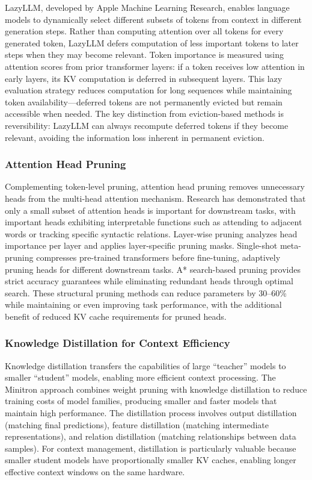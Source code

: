 \documentclass[11pt,letterpaper]{article}
\begin{document}
LazyLLM, developed by Apple Machine Learning Research, enables language models to dynamically select different subsets of tokens from context in different generation steps. Rather than computing attention over all tokens for every generated token, LazyLLM defers computation of less important tokens to later steps when they may become relevant. Token importance is measured using attention scores from prior transformer layers: if a token receives low attention in early layers, its KV computation is deferred in subsequent layers. This lazy evaluation strategy reduces computation for long sequences while maintaining token availability---deferred tokens are not permanently evicted but remain accessible when needed. The key distinction from eviction-based methods is reversibility: LazyLLM can always recompute deferred tokens if they become relevant, avoiding the information loss inherent in permanent eviction.

\subsubsection{Attention Head Pruning}

Complementing token-level pruning, attention head pruning removes unnecessary heads from the multi-head attention mechanism. Research has demonstrated that only a small subset of attention heads is important for downstream tasks, with important heads exhibiting interpretable functions such as attending to adjacent words or tracking specific syntactic relations. Layer-wise pruning analyzes head importance per layer and applies layer-specific pruning masks. Single-shot meta-pruning compresses pre-trained transformers before fine-tuning, adaptively pruning heads for different downstream tasks. A* search-based pruning provides strict accuracy guarantees while eliminating redundant heads through optimal search. These structural pruning methods can reduce parameters by 30--60\% while maintaining or even improving task performance, with the additional benefit of reduced KV cache requirements for pruned heads.

\subsubsection{Knowledge Distillation for Context Efficiency}

Knowledge distillation transfers the capabilities of large ``teacher'' models to smaller ``student'' models, enabling more efficient context processing. The Minitron approach combines weight pruning with knowledge distillation to reduce training costs of model families, producing smaller and faster models that maintain high performance. The distillation process involves output distillation (matching final predictions), feature distillation (matching intermediate representations), and relation distillation (matching relationships between data samples). For context management, distillation is particularly valuable because smaller student models have proportionally smaller KV caches, enabling longer effective context windows on the same hardware.
\end{document}
